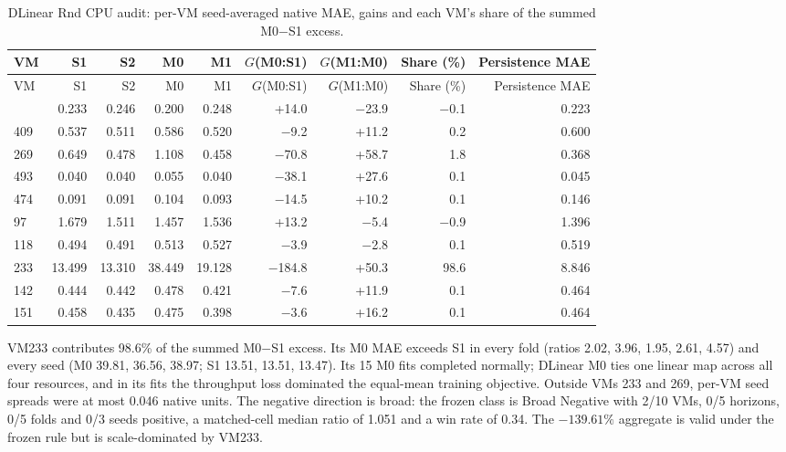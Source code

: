 \documentclass[a4paper,11pt]{article}
\begin{document}
\small
\setlength{\tabcolsep}{3pt}
\begin{longtable}{@{}lrrrrrrrr@{}}
\caption{DLinear Rnd CPU audit: per-VM seed-averaged native MAE, gains and each VM's share of the summed M0$-$S1 excess.}\label{tab:supp-t2-audit}\\
\toprule
VM & S1 & S2 & M0 & M1 & $G$(M0:S1) & $G$(M1:M0) & Share (\%) & Persistence MAE \\
\midrule
\endfirsthead
\toprule
VM & S1 & S2 & M0 & M1 & $G$(M0:S1) & $G$(M1:M0) & Share (\%) & Persistence MAE \\
\midrule
\endhead
\bottomrule
\endfoot
99 & 0.233 & 0.246 & 0.200 & 0.248 & +14.0 & $-$23.9 & $-$0.1 & 0.223 \\
409 & 0.537 & 0.511 & 0.586 & 0.520 & $-$9.2 & +11.2 & 0.2 & 0.600 \\
269 & 0.649 & 0.478 & 1.108 & 0.458 & $-$70.8 & +58.7 & 1.8 & 0.368 \\
493 & 0.040 & 0.040 & 0.055 & 0.040 & $-$38.1 & +27.6 & 0.1 & 0.045 \\
474 & 0.091 & 0.091 & 0.104 & 0.093 & $-$14.5 & +10.2 & 0.1 & 0.146 \\
97 & 1.679 & 1.511 & 1.457 & 1.536 & +13.2 & $-$5.4 & $-$0.9 & 1.396 \\
118 & 0.494 & 0.491 & 0.513 & 0.527 & $-$3.9 & $-$2.8 & 0.1 & 0.519 \\
233 & 13.499 & 13.310 & 38.449 & 19.128 & $-$184.8 & +50.3 & 98.6 & 8.846 \\
142 & 0.444 & 0.442 & 0.478 & 0.421 & $-$7.6 & +11.9 & 0.1 & 0.464 \\
151 & 0.458 & 0.435 & 0.475 & 0.398 & $-$3.6 & +16.2 & 0.1 & 0.464 \\
\end{longtable}
\normalsize\setlength{\tabcolsep}{4pt}

VM233 contributes 98.6\% of the summed M0$-$S1 excess. Its M0 MAE exceeds S1 in every fold (ratios 2.02, 3.96, 1.95, 2.61, 4.57) and every seed (M0 39.81, 36.56, 38.97; S1 13.51, 13.51, 13.47). Its 15 M0 fits completed normally; DLinear M0 ties one linear map across all four resources, and in its fits the throughput loss dominated the equal-mean training objective. Outside VMs 233 and 269, per-VM seed spreads were at most 0.046 native units. The negative direction is broad: the frozen class is Broad Negative with 2/10 VMs, 0/5 horizons, 0/5 folds and 0/3 seeds positive, a matched-cell median ratio of 1.051 and a win rate of 0.34. The $-139.61\%$ aggregate is valid under the frozen rule but is scale-dominated by VM233.
\clearpage
\end{document}
